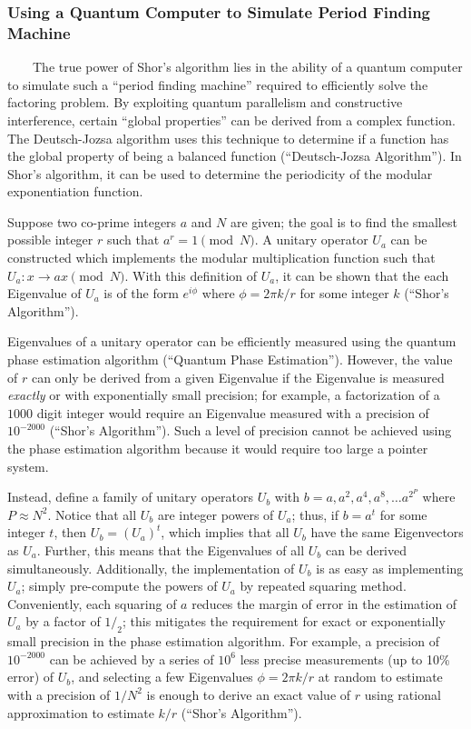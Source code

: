 \documentclass[11pt]{article}
\begin{document}
    \hypertarget{using-a-quantum-computer-to-simulate-period-finding-machine}{%
\subsubsection{Using a Quantum Computer to Simulate Period Finding
Machine}\label{using-a-quantum-computer-to-simulate-period-finding-machine}}

~~~~The true power of Shor's algorithm lies in the ability of a quantum
computer to simulate such a ``period finding machine'' required to
efficiently solve the factoring problem. By exploiting quantum
parallelism and constructive interference, certain ``global properties''
can be derived from a complex function. The Deutsch-Jozsa algorithm uses
this technique to determine if a function has the global property of
being a balanced function (``Deutsch-Jozsa Algorithm''). In Shor's
algorithm, it can be used to determine the periodicity of the modular
exponentiation function.

Suppose two co-prime integers \(a\) and \(N\) are given; the goal is to
find the smallest possible integer \(r\) such that \(a^r=1\pmod N\). A
unitary operator \(U_a\) can be constructed which implements the modular
multiplication function such that \(U_a: x\rightarrow ax\pmod N\). With
this definition of \(U_a\), it can be shown that the each Eigenvalue of
\(U_a\) is of the form \(e^{i\phi}\) where \(\phi=2\pi k/r\) for some
integer \(k\) (``Shor's Algorithm'').

Eigenvalues of a unitary operator can be efficiently measured using the
quantum phase estimation algorithm (``Quantum Phase Estimation'').
However, the value of \(r\) can only be derived from a given Eigenvalue
if the Eigenvalue is measured \emph{exactly} or with exponentially small
precision; for example, a factorization of a \(1000\) digit integer
would require an Eigenvalue measured with a precision of \(10^{-2000}\)
(``Shor's Algorithm''). Such a level of precision cannot be achieved
using the phase estimation algorithm because it would require too large
a pointer system.

Instead, define a family of unitary operators \(U_b\) with
\(b=a, a^2, a^4, a^8,\dots a^{2^P}\) where \(P\approx N^2\). Notice that
all \(U_b\) are integer powers of \(U_a\); thus, if \(b=a^t\) for some
integer \(t\), then \(U_b=(U_a)^t\), which implies that all \(U_b\) have
the same Eigenvectors as \(U_a\). Further, this means that the
Eigenvalues of all \(U_b\) can be derived simultaneously. Additionally,
the implementation of \(U_b\) is as easy as implementing \(U_a\); simply
pre-compute the powers of \(U_a\) by repeated squaring method.
Conveniently, each squaring of \(a\) reduces the margin of error in the
estimation of \(U_a\) by a factor of \(1/_2\); this mitigates the
requirement for exact or exponentially small precision in the phase
estimation algorithm. For example, a precision of \(10^{-2000}\) can be
achieved by a series of \(10^6\) less precise measurements (up to 10\%
error) of \(U_b\), and selecting a few Eigenvalues \(\phi=2\pi k/r\) at
random to estimate with a precision of \(1/N^2\) is enough to derive an
exact value of \(r\) using rational approximation to estimate \(k/r\)
(``Shor's Algorithm'').
\end{document}
